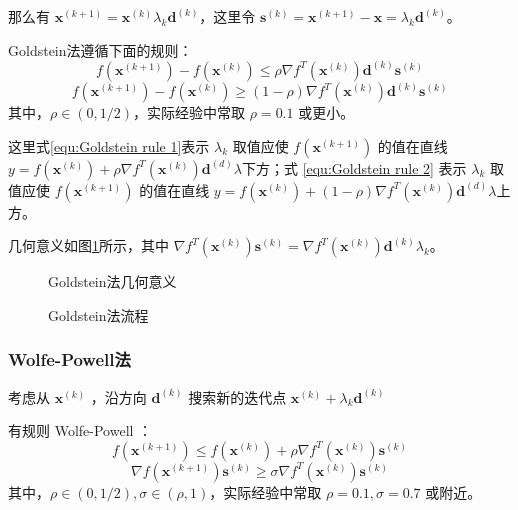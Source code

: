 \documentclass{book}
\begin{document}
那么有 $\boldsymbol{x}^{(k+1)}=\boldsymbol{x}^{(k)}\lambda_k\boldsymbol{d}^{(k)}$，这里令 $\boldsymbol{s}^{(k)}=\boldsymbol{x}^{(k+1)}-\boldsymbol{x}=\lambda_k\boldsymbol{d}^{(k)}$。

Goldstein法遵循下面的规则：
\begin{equation}
    f(\boldsymbol{x}^{(k+1)})-f(\boldsymbol{x}^{(k)})\le\rho\nabla f^T(\boldsymbol{x}^{(k)})\boldsymbol{d}^{(k)}\boldsymbol{s}^{(k)}
    \label{equ:Goldstein rule 1}
\end{equation}
\begin{equation}
    f(\boldsymbol{x}^{(k+1)})-f(\boldsymbol{x}^{(k)})\ge(1-\rho)\nabla f^T(\boldsymbol{x}^{(k)})\boldsymbol{d}^{(k)}\boldsymbol{s}^{(k)}
    \label{equ:Goldstein rule 2}
\end{equation}
其中，$\rho\in(0,1/2)$，实际经验中常取 $\rho=0.1$ 或更小。

这里式\ref{equ:Goldstein rule 1}表示 $\lambda_k$ 取值应使 $f(\boldsymbol{x}^{(k+1)})$ 的值在直线 $y=f(\boldsymbol{x}^{(k)})+\rho\nabla f^T(\boldsymbol{x}^{(k)})\boldsymbol{d}^{(d)}\lambda$下方；式 \ref{equ:Goldstein rule 2} 表示 $\lambda_k$ 取值应使 $f(\boldsymbol{x}^{(k+1)})$ 的值在直线 $y=f(\boldsymbol{x}^{(k)})+(1-\rho)\nabla f^T(\boldsymbol{x}^{(k)})\boldsymbol{d}^{(d)}\lambda$上方。

几何意义如图\ref{fig:Axis of Goldstein method}所示，其中 $\nabla f^T(\boldsymbol{x}^{(k)})\boldsymbol{s}^{(k)}=\nabla f^T(\boldsymbol{x}^{(k)})\boldsymbol{d}^{(k)}\lambda_k$。

\begin{figure}[ht]
    \centering
    
    \caption{Goldstein法几何意义}
    \label{fig:Axis of Goldstein method}
\end{figure}

\begin{figure}[ht]
    \centering
    
    \caption{Goldstein法流程}
    \label{fig:flow of Goldstein method}
\end{figure}

\subsubsection{Wolfe-Powell法}

考虑从 $\boldsymbol{x}^{(k)}$ ，沿方向 $\boldsymbol{d}^{(k)}$ 搜索新的迭代点 $\boldsymbol{x}^{(k)}+\lambda_k\boldsymbol{d}^{(k)}$

有规则 Wolfe-Powell ：
\begin{equation}
    f(\boldsymbol{x}^{(k+1)})\le f(\boldsymbol{x}^{(k)})+\rho\nabla f^T(\boldsymbol{x}^{(k)})\boldsymbol{s}^{(k)}
    \label{equ:Wolfe-Powell rule 1}
\end{equation}
\begin{equation}
    \nabla f(\boldsymbol{x}^{(k+1)})\boldsymbol{s}^{(k)}\ge\sigma\nabla f^T(\boldsymbol{x}^{(k)})\boldsymbol{s}^{(k)}
    \label{equ:Wolfe-Powell rule 2}
\end{equation}
其中，$\rho\in(0,1/2),\sigma\in(\rho,1)$，实际经验中常取 $\rho=0.1, \sigma=0.7$ 或附近。
\end{document}
